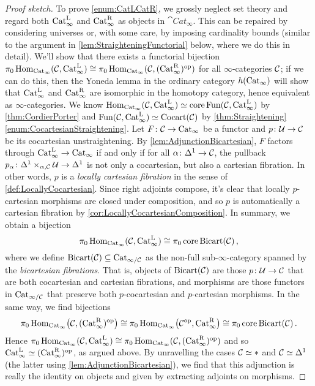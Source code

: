 \begin{proof}[Proof sketch]
	To prove \cref{enum:CatLCatR}, we grossly neglect set theory and regard both $\mathrm{Cat}_\infty^{\mathrm{L}}$ and $\mathrm{Cat}_\infty^{\mathrm{R}}$ as objects in $\cat{Cat}_\infty$. This can be repaired by considering universes or, with some care, by imposing cardinality bounds (similar to the argument in \cref{lem:StraighteningFunctorial} below, where we do this in detail). We'll show that there exists a functorial bijection $\pi_0\operatorname{Hom}_{\mathrm{Cat}_\infty}(\mathcal{C},\mathrm{Cat}_\infty^{\mathrm{L}})\cong \pi_0\operatorname{Hom}_{\mathrm{Cat}_\infty}(\mathcal{C},(\mathrm{Cat}_\infty^{\mathrm{R}})^{\mathrm{op}})$ for all $\infty$-categories $\mathcal{C}$; if we can do this, then the Yoneda lemma in the ordinary category $h(\mathrm{Cat}_\infty)$ will show that $\mathrm{Cat}_\infty^{\mathrm{L}}$ and $\mathrm{Cat}_\infty^{\mathrm{R}}$ are isomorphic in the homotopy category, hence equivalent as $\infty$-categories. We know $\operatorname{Hom}_{\mathrm{Cat}_\infty}(\mathcal{C},\mathrm{Cat}_\infty^{\mathrm{L}})\simeq \operatorname{core}\operatorname{Fun}(\mathcal{C},\mathrm{Cat}_\infty^{\mathrm{L}})$ by \cref{thm:CordierPorter} and $\operatorname{Fun}(\mathcal{C},\mathrm{Cat}_\infty^{\mathrm{L}})\simeq \mathrm{Cocart}(\mathcal{C})$ by \cref{thm:Straightening}\cref{enum:CocartesianStraightening}. Let $F\colon \mathcal{C}\rightarrow \mathrm{Cat}_\infty$ be a functor and $p\colon \mathcal{U}\rightarrow \mathcal{C}$ be its cocartesian unstraightening. By \cref{lem:AdjunctionBicartesian}, $F$ factors through $\mathrm{Cat}_\infty^{\mathrm{L}}\rightarrow \mathrm{Cat}_\infty$ if and only if for all $\alpha\colon\Delta^1\rightarrow \mathcal{C}$, the pullback $p_{\alpha}\colon \Delta^1\times_{\alpha,\mathcal{C}}\mathcal{U}\rightarrow \Delta^1$ is not only a cocartesian, but also a cartesian fibration. In other words, $p$ is a \emph{locally cartesian fibration} in the sense of \cref{def:LocallyCocartesian}. Since right adjoints compose, it's clear that locally $p$-cartesian morphisms are closed under composition, and so $p$ is automatically a cartesian fibration by \cref{cor:LocallyCocartesianComposition}. In summary, we obtain a bijection 
	\begin{equation*}
		\pi_0\operatorname{Hom}_{\mathrm{Cat}_\infty}(\mathcal{C},\mathrm{Cat}_\infty^{\mathrm{L}})\cong \pi_0\operatorname{core}\mathrm{Bicart}(\mathcal{C})\,,
	\end{equation*}
	where we define $\mathrm{Bicart}(\mathcal{C})\subseteq \mathrm{Cat}_{\infty/\mathcal{C}}$ as the non-full sub-$\infty$-category spanned by the \emph{bicartesian fibrations}. That is, objects of $\mathrm{Bicart}(\mathcal{C})$ are those $p\colon \mathcal{U}\rightarrow \mathcal{C}$ that are both cocartesian and cartesian fibrations, and morphisms are those functors in $\mathrm{Cat}_{\infty/\mathcal{C}}$ that preserve both $p$-cocartesian and $p$-cartesian morphisms. In the same way, we find bijections 
	\begin{equation*}
		\pi_0\operatorname{Hom}_{\mathrm{Cat}_\infty}\bigl(\mathcal{C},(\mathrm{Cat}_\infty^{\mathrm{R}})^{\mathrm{op}}\bigr)\cong \pi_0\operatorname{Hom}_{\mathrm{Cat}_\infty}\bigl(\mathcal{C}^{\mathrm{op}},\mathrm{Cat}_\infty^{\mathrm{R}}\bigr)\cong \pi_0\operatorname{core}\mathrm{Bicart}(\mathcal{C})\,.
	\end{equation*}
	Hence $\pi_0\operatorname{Hom}_{\mathrm{Cat}_\infty}(\mathcal{C},\mathrm{Cat}_\infty^{\mathrm{L}})\cong \pi_0\operatorname{Hom}_{\mathrm{Cat}_\infty}(\mathcal{C},(\mathrm{Cat}_\infty^{\mathrm{R}})^{\mathrm{op}})$ and so $\mathrm{Cat}_\infty^{\mathrm{L}}\simeq (\mathrm{Cat}_\infty^{\mathrm{R}})^{\mathrm{op}}$, as argued above. By unravelling the cases $\mathcal{C}\simeq *$ and $\mathcal{C}\simeq \Delta^1$ (the latter using \cref{lem:AdjunctionBicartesian}), we find that this adjunction is really the identity on objects and given by extracting adjoints on morphisms.
\end{proof}

